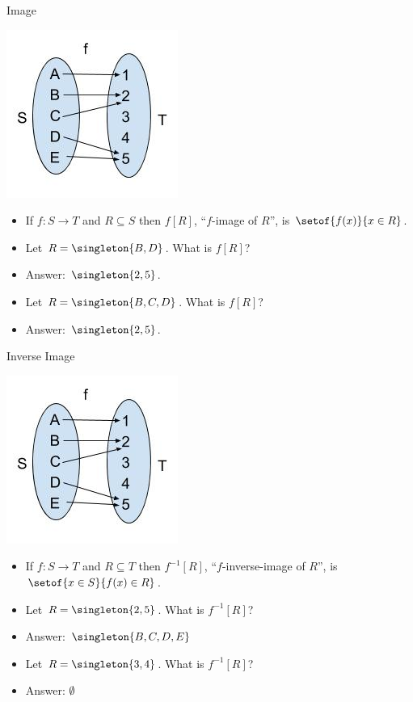 \documentclass{beamer}
\begin{document}
\begin{frame}{Image}
\begin{center}
\includegraphics[scale=0.25]{function1}
\end{center}

\begin{itemize}
\item If $f:S\to T$ and $R\subseteq S$ then $f[R]$, ``$f$-image of $R$'', is
$\setof{f(x)}{x\in R}$.
\item Let $R=\singleton{B,D}$. What is $f[R]$?
\item Answer: $\singleton{2, 5}$.
\item Let $R=\singleton{B,C, D}$. What is $f[R]$?
\item Answer: $\singleton{2,5}$.
\end{itemize}
\end{frame}



\begin{frame}{Inverse Image}
\begin{center}
\includegraphics[scale=0.25]{function1}
\end{center}

\begin{itemize}
\item If $f:S\to T$ and $R\subseteq T$ then $f^{-1}[R]$,
``$f$-inverse-image of $R$'', is
$\setof{x\in S}{f(x)\in R}$.
\item Let $R=\singleton{2,5}$. What is $f^{-1}[R]$?
\item Answer: $\singleton{B, C, D, E}$
\item Let $R=\singleton{3,4}$. What is $f^{-1}[R]$?
\item Answer: $\emptyset$
\end{itemize}
\end{frame}
\end{document}
